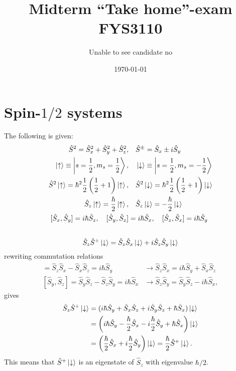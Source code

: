 \documentclass{article}
\title{Midterm ``Take home''-exam\\
		\large{FYS3110}}
\author{Unable to see candidate no}
\date{\today}
\begin{document}
\maketitle

\section{Spin-$1/2$ systems}

The following is given:
\begin{align*}
\hat{S}^2 = \hat{S}_x^2+\hat{S}_y^2+\hat{S}_z^2, &\quad
\hat{S}^{\pm}=\hat{S}_x \pm i\hat{S}_y \\
\ket{\uparrow} \equiv \ket{s=\frac{1}{2},m_s=\frac{1}{2}}, &\quad 
\ket{\downarrow} \equiv \ket{s=\frac{1}{2},m_s=-\frac{1}{2}} \\
\hat{S}^2\ket{\uparrow} = \hbar^2\frac{1}{2}\left(\frac{1}{2}+1\right)\ket{\uparrow}, &\quad
\hat{S}^2\ket{\downarrow} = \hbar^2\frac{1}{2}\left(\frac{1}{2}+1\right)\ket{\downarrow} \\
\hat{S}_z\ket{\uparrow} = \frac{\hbar}{2}\ket{\uparrow}, &\quad 
\hat{S}_z\ket{\downarrow} = -\frac{\hbar}{2}\ket{\downarrow} \\
[\hat{S}_x,\hat{S}_y]=i\hbar\hat{S}_z, \quad
[\hat{S}_y,\hat{S}_z]&=i\hbar\hat{S}_x, \quad
[\hat{S}_z,\hat{S}_x]=i\hbar\hat{S}_y 
\end{align*}


\subsection{}
\begin{equation*}
\hat{S}_z\hat{S}^+\ket{\downarrow} = \hat{S}_z\hat{S}_x\ket{\downarrow} + i\hat{S}_z\hat{S}_y\ket{\downarrow}
\end{equation*}
rewriting commutation relations
\begin{align*}
[\hat{S}_z,\hat{S}_x]=\hat{S}_z\hat{S}_x - \hat{S}_x\hat{S}_z =i\hbar\hat{S}_y  &\rightarrow
\hat{S}_z\hat{S}_x = i\hbar\hat{S}_y + \hat{S}_x\hat{S}_z \\
[\hat{S}_y,\hat{S}_z]=\hat{S}_y\hat{S}_z - \hat{S}_z\hat{S}_y =i\hbar\hat{S}_x  &\rightarrow
\hat{S}_z\hat{S}_y = \hat{S}_y\hat{S}_z - i\hbar\hat{S}_x,
\end{align*}
gives
\begin{align*}
\hat{S}_z\hat{S}^+\ket{\downarrow} &=(i\hbar\hat{S}_y+\hat{S}_x\hat{S}_z+i\hat{S}_y\hat{S}_z+\hbar\hat{S}_x)\ket{\downarrow} \\
&= \left(i\hbar\hat{S}_y -\frac{\hbar}{2}\hat{S}_x -i\frac{\hbar}{2}\hat{S}_y + \hbar\hat{S}_x \right) \ket{\downarrow} \\
&=\left(\frac{\hbar}{2}\hat{S}_x + i\frac{\hbar}{2} \hat{S}_y\right)\ket{\downarrow} = \frac{\hbar}{2}\hat{S}^+\ket{\downarrow}.
\end{align*}
This means that $\hat{S}^+\ket{\downarrow}$ is an eigenstate of $\hat{S}_z$ with eigenvalue $\hbar/2$.
\end{document}
